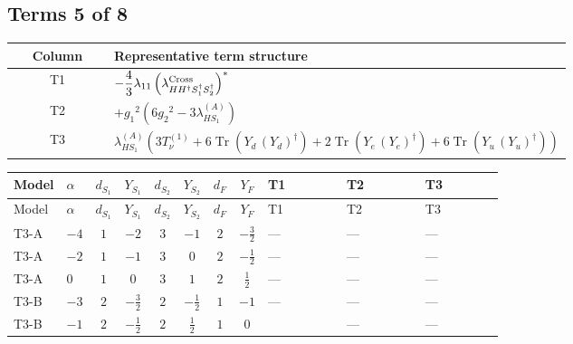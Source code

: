 \documentclass[8pt]{article}
\begin{document}
\begin{landscape}
\subsection*{Terms 5 of 8}
\begin{center}
\begin{tabular}{@{}c >{\raggedright\arraybackslash}p{0.82\linewidth}@{}}
\toprule
Column & Representative term structure \\
\midrule
T1 & \(\displaystyle -\frac{4}{3} {\lambda_{11}} \left({\lambda_{H H^\dagger S_1^\dagger S_2^\dagger}^{\rm Cross}}\right)^{*}\) \\
\midrule
T2 & \(\displaystyle +{g_1}^2 \left(6 {g_2}^2-3 {\lambda_{HS_1}^{(A)}}\right)\) \\
\midrule
T3 & \(\displaystyle {\lambda_{HS_1}^{(A)}} (3 T_{\nu}^{(1)}+6 \operatorname{Tr}\!\left({Y_d}\,\left({Y_d}\right)^{\dagger}\right)+2 \operatorname{Tr}\!\left({Y_e}\,\left({Y_e}\right)^{\dagger}\right)+6 \operatorname{Tr}\!\left({Y_u}\,\left({Y_u}\right)^{\dagger}\right))\) \\
\midrule
\bottomrule
\end{tabular}
\end{center}
\smallskip
\tiny
\begin{longtable}{@{}llcccccc >{\raggedright\arraybackslash}p{0.21\linewidth} >{\raggedright\arraybackslash}p{0.21\linewidth} >{\raggedright\arraybackslash}p{0.21\linewidth}@{}}
\toprule
Model & $\alpha$ & $d_{S_1}$ & $Y_{S_1}$ & $d_{S_2}$ & $Y_{S_2}$ & $d_F$ & $Y_F$ & T1 & T2 & T3 \\
\midrule
\endfirsthead
\toprule
Model & $\alpha$ & $d_{S_1}$ & $Y_{S_1}$ & $d_{S_2}$ & $Y_{S_2}$ & $d_F$ & $Y_F$ & T1 & T2 & T3 \\
\midrule
\endhead
T3-A & $-4$ & $1$ & $-2$ & $3$ & $-1$ & $2$ & $-\frac{3}{2}$ & --- & --- & --- \\
\midrule
T3-A & $-2$ & $1$ & $-1$ & $3$ & $0$ & $2$ & $-\frac{1}{2}$ & --- & --- & --- \\
\midrule
T3-A & $0$ & $1$ & $0$ & $3$ & $1$ & $2$ & $\frac{1}{2}$ & --- & --- & --- \\
\midrule
T3-B & $-3$ & $2$ & $-\frac{3}{2}$ & $2$ & $-\frac{1}{2}$ & $1$ & $-1$ & --- & --- & --- \\
\midrule
T3-B & $-1$ & $2$ & $-\frac{1}{2}$ & $2$ & $\frac{1}{2}$ & $1$ & $0$ & \scriptsize\adjustbox{max width=\linewidth}{$\begin{gathered} -\frac{4}{3} {\lambda_{11}} \left({\lambda_{H H^\dagger S_1^\dagger S_2^\dagger}^{\rm Cross}}\right)^{*}\end{gathered}$} & --- & --- \\

\end{longtable}
\end{landscape}
\end{document}
